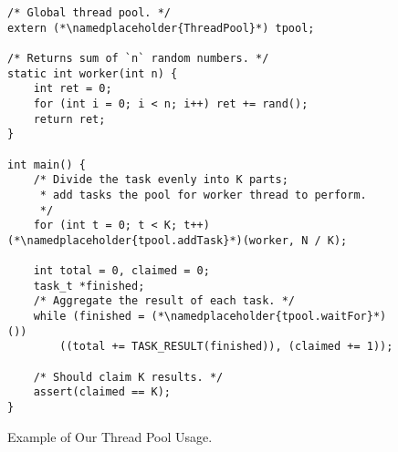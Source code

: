 \begin{figure}[ht]
    \centering
\begin{lstlisting}[frame=tlbr]
/* Global thread pool. */
extern (*\namedplaceholder{ThreadPool}*) tpool;

/* Returns sum of `n` random numbers. */
static int worker(int n) {
    int ret = 0;
    for (int i = 0; i < n; i++) ret += rand();
    return ret;
}

int main() {
    /* Divide the task evenly into K parts; 
     * add tasks the pool for worker thread to perform. 
     */
    for (int t = 0; t < K; t++) (*\namedplaceholder{tpool.addTask}*)(worker, N / K);

    int total = 0, claimed = 0;
    task_t *finished;
    /* Aggregate the result of each task. */
    while (finished = (*\namedplaceholder{tpool.waitFor}*)()) 
        ((total += TASK_RESULT(finished)), (claimed += 1));
    
    /* Should claim K results. */
    assert(claimed == K);
}
\end{lstlisting}
    \caption{Example of Our Thread Pool Usage.}
    \label{code:tpdemo}
\end{figure}


